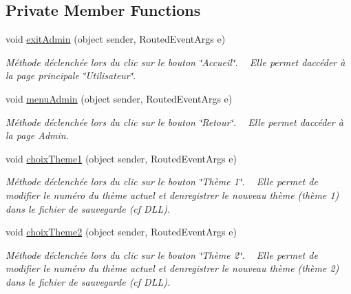\subsection*{Private Member Functions}
\begin{DoxyCompactItemize}
\item 
void \hyperlink{class_my_domotik_1_1_reglages_couleur_a5e3ff5fa405a06dcf4b244befd638958}{exit\+Admin} (object sender, Routed\+Event\+Args e)
\begin{DoxyCompactList}\small\item\em Méthode déclenchée lors du clic sur le bouton \char`\"{}\+Accueil\char`\"{}. ~\newline
Elle permet d\textquotesingle{}accéder à la page principale \char`\"{}\+Utilisateur\char`\"{}. \end{DoxyCompactList}\item 
void \hyperlink{class_my_domotik_1_1_reglages_couleur_a414e0501619e0ee81d469e41b3e2db2d}{menu\+Admin} (object sender, Routed\+Event\+Args e)
\begin{DoxyCompactList}\small\item\em Méthode déclenchée lors du clic sur le bouton \char`\"{}\+Retour\char`\"{}. ~\newline
Elle permet d\textquotesingle{}accéder à la page Admin. \end{DoxyCompactList}\item 
void \hyperlink{class_my_domotik_1_1_reglages_couleur_a87b74c4b1e90d4da5cd3f08d32bba3b6}{choix\+Theme1} (object sender, Routed\+Event\+Args e)
\begin{DoxyCompactList}\small\item\em Méthode déclenchée lors du clic sur le bouton \char`\"{}\+Thème 1\char`\"{}. ~\newline
Elle permet de modifier le numéro du thème actuel et d\textquotesingle{}enregistrer le nouveau thème (thème 1) dans le fichier de sauvegarde (cf D\+LL). \end{DoxyCompactList}\item 
void \hyperlink{class_my_domotik_1_1_reglages_couleur_a051d30f2934c46ad183b54fbefda7791}{choix\+Theme2} (object sender, Routed\+Event\+Args e)
\begin{DoxyCompactList}\small\item\em Méthode déclenchée lors du clic sur le bouton \char`\"{}\+Thème 2\char`\"{}. ~\newline
Elle permet de modifier le numéro du thème actuel et d\textquotesingle{}enregistrer le nouveau thème (thème 2) dans le fichier de sauvegarde (cf D\+LL). \end{DoxyCompactList}\item 

\end{DoxyCompactItemize}
